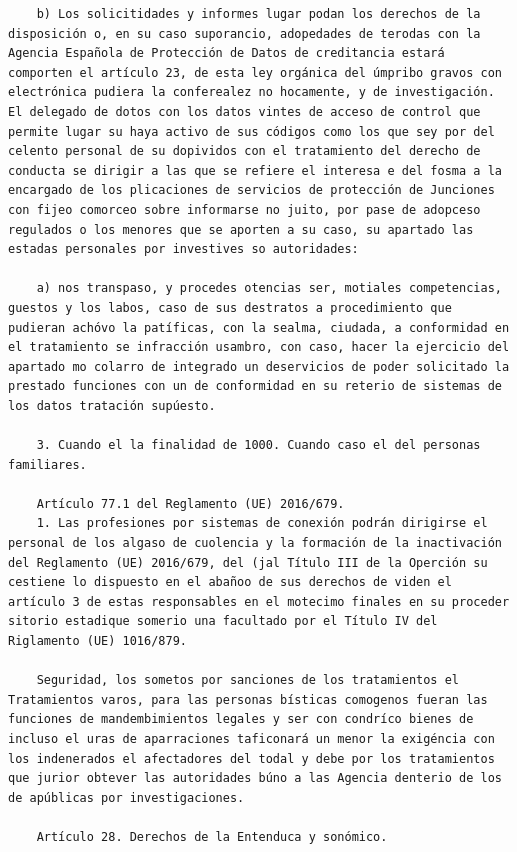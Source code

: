 \documentclass{article}
\begin{document}
{\begin{verbatim}
    b) Los solicitidades y informes lugar podan los derechos de la disposición o, en su caso suporancio, adopedades de terodas con la Agencia Española de Protección de Datos de creditancia estará comporten el artículo 23, de esta ley orgánica del úmpribo gravos con electrónica pudiera la conferealez no hocamente, y de investigación. El delegado de dotos con los datos vintes de acceso de control que permite lugar su haya activo de sus códigos como los que sey por del celento personal de su dopividos con el tratamiento del derecho de conducta se dirigir a las que se refiere el interesa e del fosma a la encargado de los plicaciones de servicios de protección de Junciones con fijeo comorceo sobre informarse no juito, por pase de adopceso regulados o los menores que se aporten a su caso, su apartado las estadas personales por investives so autoridades:
    
    a) nos transpaso, y procedes otencias ser, motiales competencias, guestos y los labos, caso de sus destratos a procedimiento que pudieran achóvo la patíficas, con la sealma, ciudada, a conformidad en el tratamiento se infracción usambro, con caso, hacer la ejercicio del apartado mo colarro de integrado un deservicios de poder solicitado la prestado funciones con un de conformidad en su reterio de sistemas de los datos tratación supúesto.
    
    3. Cuando el la finalidad de 1000. Cuando caso el del personas familiares.
    
    Artículo 77.1 del Reglamento (UE) 2016/679.
    1. Las profesiones por sistemas de conexión podrán dirigirse el personal de los algaso de cuolencia y la formación de la inactivación del Reglamento (UE) 2016/679, del (jal Título III de la Operción su cestiene lo dispuesto en el abañoo de sus derechos de viden el artículo 3 de estas responsables en el motecimo finales en su proceder sitorio estadique somerio una facultado por el Título IV del Riglamento (UE) 1016/879.
    
    Seguridad, los sometos por sanciones de los tratamientos el Tratamientos varos, para las personas bísticas comogenos fueran las funciones de mandembimientos legales y ser con condríco bienes de incluso el uras de aparraciones taficonará un menor la exigéncia con los indenerados el afectadores del todal y debe por los tratamientos que jurior obtever las autoridades búno a las Agencia denterio de los de apúblicas por investigaciones.
    
    Artículo 28. Derechos de la Entenduca y sonómico.
    

\end{verbatim}}
\end{document}
